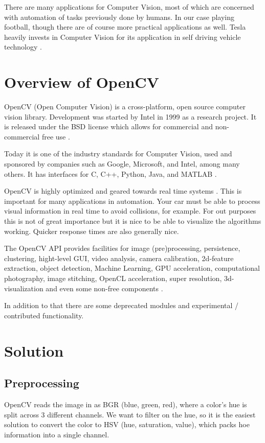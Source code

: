 \documentclass[12pt, a4paper]{article}
\begin{document}
There are many applications for Computer Vision, most of which are concerned with automation of tasks previously done by humans. In our case playing football, though there are of course more practical applications as well.
Tesla heavily invests in Computer Vision for its application in self driving vehicle technology \cite{teslaAutopilot} \cite{teslaCVArticle}.

\section{Overview of OpenCV}
OpenCV (Open Computer Vision) is a cross-platform, open source computer vision library. Development was started by Intel in 1999 as a research project. It is released under the BSD license which allows for commercial and non-commercial free use \cite{learningOpenCV}.

Today it is one of the industry standards for Computer Vision, used and sponsored by companies such as Google, Microsoft, and Intel, among many others. It has interfaces for C, C++, Python, Java, and MATLAB \cite{aboutOpenCV}.

OpenCV is highly optimized and geared towards real time systems \cite{aboutOpenCV}. This is important for many applications in automation. Your car must be able to process visual information in real time to avoid collisions, for example.
For out purposes this is not of great importance but it is nice to be able to visualize the algorithms working. Quicker response times are also generally nice.

The OpenCV API provides facilities for image (pre)processing, persistence, clustering, hight-level GUI, video analysis, camera calibration, 2d-feature extraction, object detection, Machine Learning, GPU acceleration, computational photography, image stitching, OpenCL acceleration, super resolution, 3d-visualization and even some non-free components \cite{openCVNonFree}.

In addition to that there are some deprecated modules and experimental / contributed functionality. \cite{openCVRefMan}

\section{Solution}
\subsection{Preprocessing}
OpenCV reads the image in as BGR (blue, green, red), where a color's hue is split across 3 different channels. We want to filter on the hue, so it is the easiest solution to convert the color to HSV (hue, saturation, value), which packs hoe information into a single channel.
\end{document}
